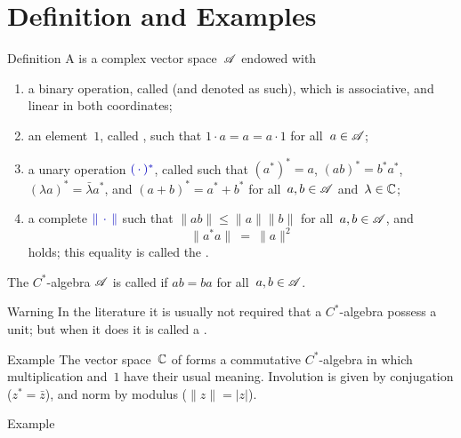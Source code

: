\documentclass[a]{subfiles}
\begin{document}
\section{Definition and Examples}
\begin{parsec}
\begin{point}{Definition}
A 
is a complex vector space~$\mathscr{A}$
endowed with
\begin{enumerate}
\item
a binary operation,
called 
(and denoted as such),
which is associative, and linear in both coordinates;
\item
an element~$1$, called 
,
such that $1\cdot a = a = a\cdot 1$
for all~$a\in \mathscr{A}$;
\item
a unary operation $\Define{(\,\cdot\,)^*}$,
called  %
%
such that $(a^*)^*=a$,
$(ab)^*=b^*a^*$,
$(\lambda a)^* = \bar\lambda a^*$,
and $(a+b)^* = a^*+b^*$
for all~$a,b\in\mathscr{A}$ and~$\lambda\in \mathbb{C}$;
\item
a complete %
$\Define{\|\,\cdot\,\|}$
such that
$\|ab\|\leq\|a\|\|b\|$
for all~$a,b\in\mathscr{A}$,
and 
\begin{equation*}
\label{eq:Cstar-identity}
\|a^*a\|\ =\ \|a\|^2
\end{equation*}
holds; this equality is called the .%
\end{enumerate}
The $C^*$-algebra $\mathscr{A}$ is called %
if $ab=ba$ for all~$a,b\in\mathscr{A}$.
\begin{point}{Warning}%
In the literature it is usually not
required that a $C^*$-algebra
possess a unit; but when it does it is called
a .%
\end{point}
\end{point}
\begin{point}{Example}%
The vector space~$\mathbb{C}$ of %
forms a commutative  $C^*$-algebra
in which
multiplication and~$1$
have their usual meaning.
Involution is given by conjugation ($z^*=\bar{z}$),
and norm by modulus ($\|z\|=|z|$).
\end{point}
\begin{point}{Example}%

\end{point}
\end{parsec}
\end{document}
